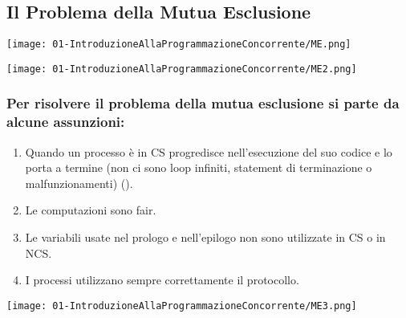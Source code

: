 \subsection{Il Problema della Mutua Esclusione}



\begin{center}
    \texttt{[image: 01-IntroduzioneAllaProgrammazioneConcorrente/ME.png]}
\end{center}


\begin{center}
    \texttt{[image: 01-IntroduzioneAllaProgrammazioneConcorrente/ME2.png]}
\end{center}

\subsubsection{Per risolvere il problema della mutua esclusione si parte da alcune assunzioni:}

\begin{enumerate}
  \item Quando un processo è in CS progredisce nell'esecuzione del suo codice e lo porta a termine (non ci sono loop infiniti, statement di terminazione o malfunzionamenti) ().
  \item Le computazioni sono fair.
  \item Le variabili usate nel prologo e nell'epilogo non sono utilizzate in CS o in NCS.
  \item I processi utilizzano sempre correttamente il protocollo.
\end{enumerate}


\begin{center}
    \texttt{[image: 01-IntroduzioneAllaProgrammazioneConcorrente/ME3.png]}
\end{center}

